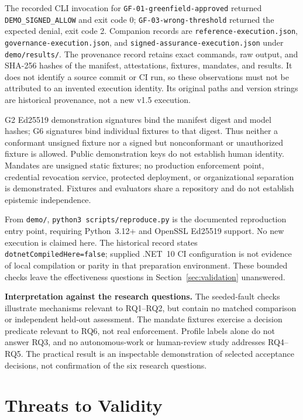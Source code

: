 \documentclass[11pt,a4paper]{article}
\begin{document}
The recorded CLI invocation for \texttt{GF-01-greenfield-approved} returned \texttt{DEMO\_SIGNED\_ALLOW} and exit code 0; \texttt{GF-03-wrong-threshold} returned the expected denial, exit code 2. Companion records are \texttt{reference-execution.json}, \texttt{governance-execution.json}, and \texttt{signed-assurance-execution.json} under \texttt{demo/results/}. The provenance record retains exact commands, raw output, and SHA-256 hashes of the manifest, attestations, fixtures, mandates, and results. It does not identify a source commit or CI run, so these observations must not be attributed to an invented execution identity. Its original paths and version strings are historical provenance, not a new v1.5 execution.

G2 Ed25519 demonstration signatures bind the manifest digest and model hashes; G6 signatures bind individual fixtures to that digest. Thus neither a conformant unsigned fixture nor a signed but nonconformant or unauthorized fixture is allowed. Public demonstration keys do not establish human identity. Mandates are unsigned static fixtures; no production enforcement point, credential revocation service, protected deployment, or organizational separation is demonstrated. Fixtures and evaluators share a repository and do not establish epistemic independence.

From \texttt{demo/}, \texttt{python3 scripts/reproduce.py} is the documented reproduction entry point, requiring Python~3.12+ and OpenSSL Ed25519 support. No new execution is claimed here. The historical record states \texttt{dotnetCompiledHere=false}; supplied .NET~10 CI configuration is not evidence of local compilation or parity in that preparation environment. These bounded checks leave the effectiveness questions in Section~\ref{sec:validation} unanswered.

\textbf{Interpretation against the research questions.} The seeded-fault checks illustrate mechanisms relevant to RQ1--RQ2, but contain no matched comparison or independent held-out assessment. The mandate fixtures exercise a decision predicate relevant to RQ6, not real enforcement. Profile labels alone do not answer RQ3, and no autonomous-work or human-review study addresses RQ4--RQ5. The practical result is an inspectable demonstration of selected acceptance decisions, not confirmation of the six research questions.

\section{Threats to Validity}\label{sec:threats}
\end{document}
